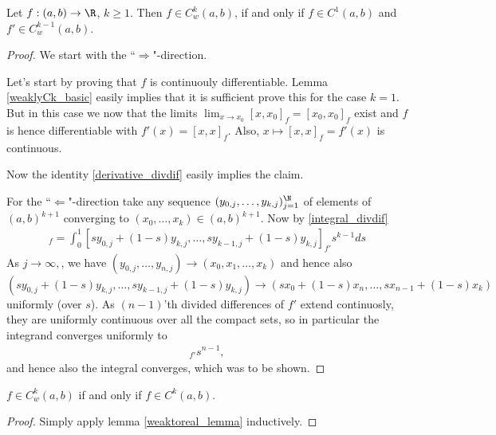 \begin{lause}\label{weaktoreal_lemma}
	Let $f : (a, b) \to \R$, $k \geq 1$. Then $f \in C_{w}^{k}(a, b)$, if and only if $f \in C^{1}(a, b)$ and $f' \in C_{w}^{k - 1}(a, b)$.
\end{lause}

\begin{proof}
	We start with the ``$\Rightarrow$"-direction.

	Let's start by proving that $f$ is continuouly differentiable. Lemma \ref{weaklyCk_basic} easily implies that it is sufficient prove this for the case $k = 1$. But in this case we now that the limits $\lim_{x \to x_{0}} [x, x_{0}]_{f} = [x_{0}, x_{0}]_{f}$ exist and $f$ is hence differentiable with $f'(x) = [x, x]_{f}$. Also, $x \mapsto [x, x]_{f} = f'(x)$ is continuous.

	Now the identity \ref{derivative_divdif} easily implies the claim.

	For the ``$\Leftarrow$"-direction take any sequence $(y_{0,j}, \ldots, y_{k, j})_{j = 1}^{\N}$ of elements of $(a, b)^{k + 1}$ converging to $(x_{0}, \ldots, x_{k}) \in (a, b)^{k + 1}$. Now by \ref{integral_divdif}
	\begin{align*}
		[y_{0, j}, y_{1, j}, \ldots, y_{k, j}]_{f} = \int_{0}^{1}[s y_{0, j} + (1 - s) y_{k, j}, \ldots, s y_{k - 1, j} + (1 - s) y_{k, j}]_{f'} s^{k - 1} d s
	\end{align*}
	As $j \to \infty, $, we have $(y_{0,j}, \ldots, y_{n, j}) \to (x_{0}, x_{1}, \ldots, x_{k})$ and hence also $(s y_{0, j} + (1 - s) y_{k, j}, \ldots, s y_{k - 1, j} + (1 - s) y_{k, j}) \to (s x_{0} + (1 - s) x_{n}, \ldots, s x_{n - 1} + (1 - s) x_{k})$ uniformly (over $s$). As $(n - 1)$'th divided differences of $f'$ extend continuosly, they are uniformly continuous over all the compact sets, so in particular the integrand converges uniformly to
	\begin{align*}
		[s x_{0} + (1 - s) x_{n}, \ldots, s x_{n - 1} + (1 - s) x_{k}]_{f'} s^{n - 1},
	\end{align*}
	and hence also the integral converges, which was to be shown.
\end{proof}

\begin{kor}
	$f \in C_{w}^{k}(a, b)$ if and only if $f \in C^{k}(a, b)$.
\end{kor}
\begin{proof}
	Simply apply lemma \ref{weaktoreal_lemma} inductively.
\end{proof}

